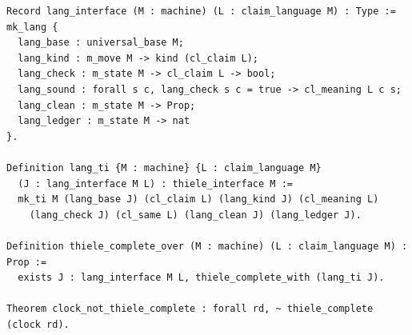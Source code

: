 {\begin{verbatim}
Record lang_interface (M : machine) (L : claim_language M) : Type := mk_lang {
  lang_base : universal_base M;
  lang_kind : m_move M -> kind (cl_claim L);
  lang_check : m_state M -> cl_claim L -> bool;
  lang_sound : forall s c, lang_check s c = true -> cl_meaning L c s;
  lang_clean : m_state M -> Prop;
  lang_ledger : m_state M -> nat
}.

Definition lang_ti {M : machine} {L : claim_language M}
  (J : lang_interface M L) : thiele_interface M :=
  mk_ti M (lang_base J) (cl_claim L) (lang_kind J) (cl_meaning L)
    (lang_check J) (cl_same L) (lang_clean J) (lang_ledger J).

Definition thiele_complete_over (M : machine) (L : claim_language M) : Prop :=
  exists J : lang_interface M L, thiele_complete_with (lang_ti J).

Theorem clock_not_thiele_complete : forall rd, ~ thiele_complete (clock rd).
\end{verbatim}}

